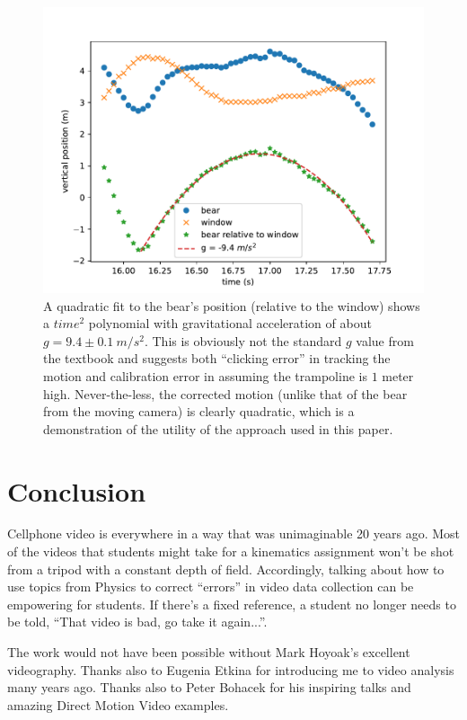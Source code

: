 \documentclass[12pt]{iopart}
\begin{document}
\begin{figure}[h]
\centering
\includegraphics[width=\columnwidth]{figure_8_bear-quadratic.pdf}
\caption{
A quadratic fit to the bear's position (relative to the window) shows a $time^2$ polynomial with gravitational acceleration of about $g=9.4\pm 0.1~m/s^2$.  This is obviously not the standard $g$ value from the textbook and suggests both ``clicking error'' in tracking the motion and calibration error in assuming the trampoline is $1$ meter high.  Never-the-less, the corrected motion (unlike that of the bear from the moving camera) is clearly quadratic, which is a demonstration of the utility of the approach used in this paper.
}
\label{bear-quadratic}
\end{figure}

\section{Conclusion}
Cellphone video is everywhere in a way that was unimaginable 20 years ago.  Most of the videos that students might take for a kinematics assignment won't be shot from a tripod with a constant depth of field.  Accordingly, talking about how to use topics from Physics to correct ``errors'' in video data collection can be empowering for students.  If there's a fixed reference, a student no longer needs to be told, ``That video is bad, go take it again...''.

\ack
The work would not have been possible without Mark Hoyoak's excellent videography.  Thanks also to Eugenia Etkina for introducing me to video analysis many years ago.  Thanks also to Peter Bohacek for his inspiring talks and amazing Direct Motion Video examples.  
\end{document}
